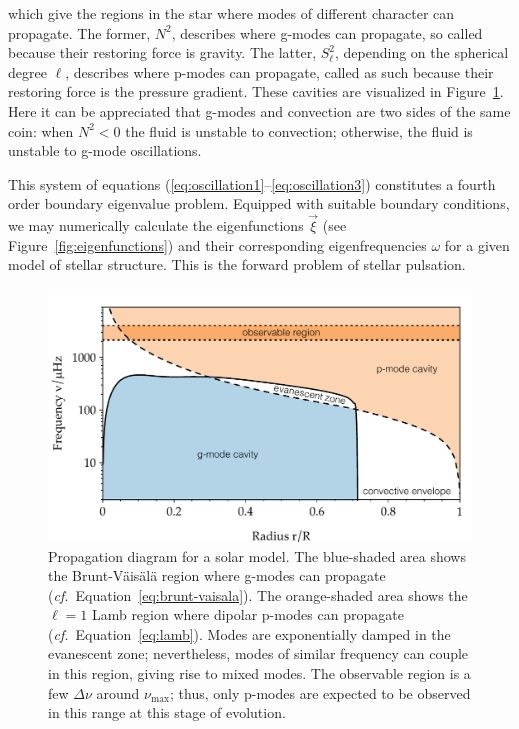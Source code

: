 which give the regions in the star where modes of different character can propagate. 
The former, $N^2$, describes where g-modes can propagate, so called because their restoring force is gravity. 
The latter, $S_\ell^2$, depending on the spherical degree $\ell$, describes where p-modes can propagate, called as such because their restoring force is the pressure gradient. 
These cavities are visualized in Figure~\ref{fig:propagation}. 
Here it can be appreciated that g-modes and convection are two sides of the same coin: when ${N^2<0}$ the fluid is unstable to convection; otherwise, the fluid is unstable to g-mode oscillations. 

This system of equations (\ref{eq:oscillation1}--\ref{eq:oscillation3}) constitutes a fourth order boundary eigenvalue problem. 
Equipped with suitable boundary conditions, we may numerically calculate the eigenfunctions $\vec\xi$ (see Figure~\ref{fig:eigenfunctions}) and their corresponding eigenfrequencies $\omega$ for a given model of stellar structure. 
This is the forward problem of stellar pulsation. 


\begin{figure}
    \centering
    \includegraphics[width=\textwidth]{ch1_introduction/figs/pulse/prop-solar.pdf}
    \caption[Propagation diagram]{Propagation diagram for a solar model. 
    The blue-shaded area shows the Brunt-V\"ais\"al\"a region where g-modes can propagate (\emph{cf.}~Equation~\ref{eq:brunt-vaisala}). 
    The orange-shaded area shows the ${\ell=1}$ Lamb region where dipolar p-modes can propagate (\emph{cf.}~Equation~\ref{eq:lamb}). 
    Modes are exponentially damped in the evanescent zone; nevertheless, modes of similar frequency can couple in this region, giving rise to mixed modes. 
    The observable region is a few ${\Delta\nu}$ around $\nu_{\max}$; thus, only p-modes are expected to be observed in this range at this stage of evolution. 
    \label{fig:propagation}}
\end{figure}

